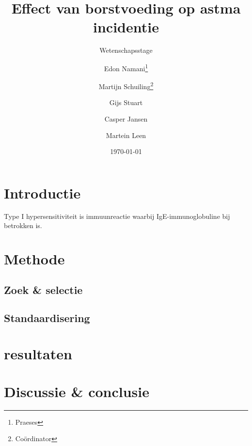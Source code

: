 \documentclass[abstract=true]{scrartcl}
\title{Effect van borstvoeding op astma incidentie}
\subtitle{Wetenschapsstage}
\author{Edon Namani\thanks{Praeses} \and Martijn Schuiling\thanks{Co\"ordinator} \and Gijs Stuart \and Casper Jansen \and Martein Leen}
\date{\today}
\begin{document}
\maketitle
    \begin{abstract}
        \blindtext
    \end{abstract}

\section{Introductie}
Type I hypersensitiviteit is immuunreactie waarbij IgE-immunoglobuline bij betrokken is\cite{abbas2017cellular}.

\section{Methode}
    \subsection{Zoek \& selectie}

    \subsection{Standaardisering}

\section{resultaten}

\section{Discussie \& conclusie}

\printbibliography
\end{document}
